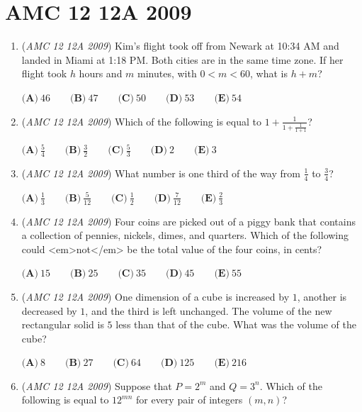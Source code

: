 \section{AMC 12 12A 2009}
        \begin{enumerate}
        	\item (\textit{AMC 12 12A 2009}) Kim's flight took off from Newark at 10:34 AM and landed in Miami at 1:18 PM. Both cities are in the same time zone. If her flight took $h$ hours and $m$ minutes, with $0 < m < 60$, what is $h + m$?


 $\textbf{(A)}\ 46 \qquad \textbf{(B)}\ 47 \qquad \textbf{(C)}\ 50 \qquad \textbf{(D)}\ 53 \qquad \textbf{(E)}\ 54$


	\item (\textit{AMC 12 12A 2009}) Which of the following is equal to $1 + \frac {1}{1 + \frac {1}{1 + 1}}$?


 $\textbf{(A)}\ \frac {5}{4} \qquad \textbf{(B)}\ \frac {3}{2} \qquad \textbf{(C)}\ \frac {5}{3} \qquad \textbf{(D)}\ 2 \qquad \textbf{(E)}\ 3$


	\item (\textit{AMC 12 12A 2009}) What number is one third of the way from $\frac14$ to $\frac34$?


 $\textbf{(A)}\ \frac {1}{3} \qquad \textbf{(B)}\ \frac {5}{12} \qquad \textbf{(C)}\ \frac {1}{2} \qquad \textbf{(D)}\ \frac {7}{12} \qquad \textbf{(E)}\ \frac {2}{3}$


	\item (\textit{AMC 12 12A 2009}) Four coins are picked out of a piggy bank that contains a collection of pennies, nickels, dimes, and quarters. Which of the following could <em>not</em> be the total value of the four coins, in cents?


 $\textbf{(A)}\ 15 \qquad \textbf{(B)}\ 25 \qquad \textbf{(C)}\ 35 \qquad \textbf{(D)}\ 45 \qquad \textbf{(E)}\ 55$


	\item (\textit{AMC 12 12A 2009}) One dimension of a cube is increased by $1$, another is decreased by $1$, and the third is left unchanged. The volume of the new rectangular solid is $5$ less than that of the cube. What was the volume of the cube?


 $\textbf{(A)}\ 8 \qquad \textbf{(B)}\ 27 \qquad \textbf{(C)}\ 64 \qquad \textbf{(D)}\ 125 \qquad \textbf{(E)}\ 216$


	\item (\textit{AMC 12 12A 2009}) Suppose that $P = 2^m$ and $Q = 3^n$. Which of the following is equal to $12^{mn}$ for every pair of integers $(m,n)$?



\end{enumerate}
